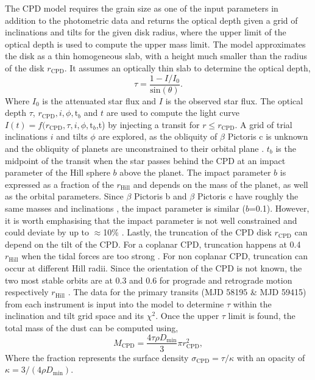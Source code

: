 \documentclass{aa}
\newcommand\picb{$\beta$ Pictoris b}
\newcommand\picc{$\beta$ Pictoris c}
\begin{document}
The CPD model requires the grain size as one of the input parameters in addition to the photometric data and returns the optical depth given a grid of inclinations and tilts for the given disk radius, where the upper limit of the optical depth is used to compute the upper mass limit. 
%
The model approximates the disk as a thin homogeneous slab, with a height much smaller than the radius of the disk $r_{\text{CPD}}$. 
%
It assumes an optically thin slab to determine the optical depth,
%
\begin{equation} 
\tau = \frac{1-I/I_0}{\text{sin}(\theta)}.
\end{equation} 
Where $I_0$ is the attenuated star flux and $I$ is the observed star flux. 
%
The optical depth $\tau$, $r_{\text{CPD}},i,\phi,\text{t}_b$ and $t$ are used to compute the light curve $I(t)=f(r_{\text{CPD}},\tau,i,\phi,\text{t}_b$,t) by injecting a transit for $r \leq r_{\text{CPD}}$. 
%
A grid of trial inclinations $i$ and tilts $\phi$ are explored, as the obliquity of \picc{} is unknown and the obliquity of planets are unconstrained to their orbital plane \citep{Laskar_1993, Kenworthy_2021}.  
%
$t_b$ is the midpoint of the transit when the star passes behind the CPD at an impact parameter of the Hill sphere $b$ above the planet.
%
The impact parameter $b$ is expressed as a fraction of the $r_{\text{Hill}}$ and depends on the mass of the planet, as well as the orbital parameters.  
%
Since \picb{} and \picc{} have roughly the same masses and inclinations \citep{Kenworthy_2021}, the impact parameter is similar ($b$=0.1).  
%
However, it is worth emphasising that the impact parameter is not well constrained and could deviate by up to $\approx$10\% \citep[e.g.][]{Wang_2016,Lagrange_2019,Nielsen_2020}.  
%
Lastly, the truncation of the CPD disk $r_{\text{CPD}}$ can depend on the tilt of the CPD.
%
For a coplanar CPD, truncation happens at 0.4 $r_{\text{Hill}}$ when the tidal forces are too strong \citep{Martin_2011}.  
%
For non coplanar CPD, truncation can occur at different Hill radii.  
%
Since the orientation of the CPD is not known, the two most stable orbits are at 0.3 and 0.6 for prograde and retrograde motion respectively $r_{\text{Hill}}$ \citep{Lubow_2015, Miranda_2015}. 
%
The data for the primary transits (MJD 58195 \& MJD 59415) from each instrument is input into the model to determine $\tau$ within the inclination and tilt grid space and its $\chi^2$. 
%
Once the upper $\tau$ limit is found, the total mass of the dust can be computed using, 
%
\begin{equation}
    M_{\text{CPD}} = \frac{4 \tau \rho D_{\text{min}} }{3} \pi r_{\text{CPD}}^2,
    \label{eq:mass_limit}
\end{equation} 
Where the fraction represents the surface density $\sigma_{\text{CPD}} = \tau / \kappa$ with an opacity of $\kappa = 3/(4 \rho D_{\text{min}})$. 
\end{document}
